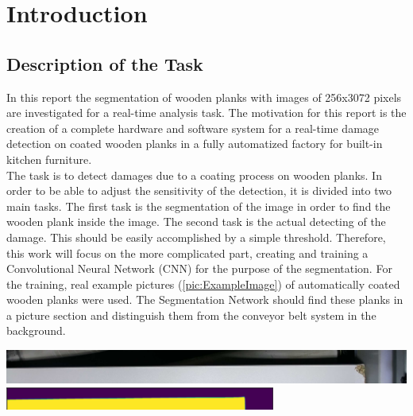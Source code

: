 \section{Introduction}


\subsection{Description of the Task}
In this report the segmentation of wooden planks with images of 256x3072 pixels are investigated for a real-time analysis task. The motivation for this report is the creation of a complete hardware and software system for a real-time damage detection on coated wooden planks in a fully automatized factory for built-in kitchen furniture.\\
The task is to detect damages due to a coating process on wooden planks. In order to be able to adjust the sensitivity of the detection, it is divided into two main tasks. The first task is the segmentation of the image in order to find the wooden plank inside the image. The second task is the actual detecting of the damage. This should be easily accomplished by a simple threshold. Therefore, this work will focus on the more complicated part, creating and training a Convolutional Neural Network (CNN) for the purpose of the segmentation. For the training, real example pictures (\ref{pic:ExampleImage}) of automatically coated wooden planks were used. The Segmentation Network should find these planks in a picture section and distinguish them from the conveyor belt system in the background.
\begin{center}\begin{minipage}[t]{\textwidth}
\includegraphics[width=\textwidth]{Images/ExampleImage.png}\label{pic:ExampleImage}
\includegraphics[width=\textwidth]{Images/m_ExampleLabel1.png}\label{pic:ExampleLabel1}
\vspace{0.5cm}
\end{minipage}\end{center}
